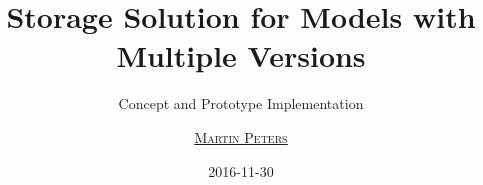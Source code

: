 \usepackage[utf8]{inputenc}
\usepackage{pifont}
\usepackage{arev}

\author[
	\textbf{\href{http://www.sbi.uni-rostock.de/team/single/martin-peters/}{Martin Peters}}
]
{
	\underline{\textsc{\href{http://freakybytes.net}{Martin Peters}}}
}

\date{2016-11-30}



\titlegraphic{
}
\title[Storage Solution for Models with Multiple Versions]{\Large Storage Solution for Models with Multiple Versions}
\subtitle{\small Concept and Prototype Implementation}


\titleimage{}
\renewcommand{\mylogo}{
}

